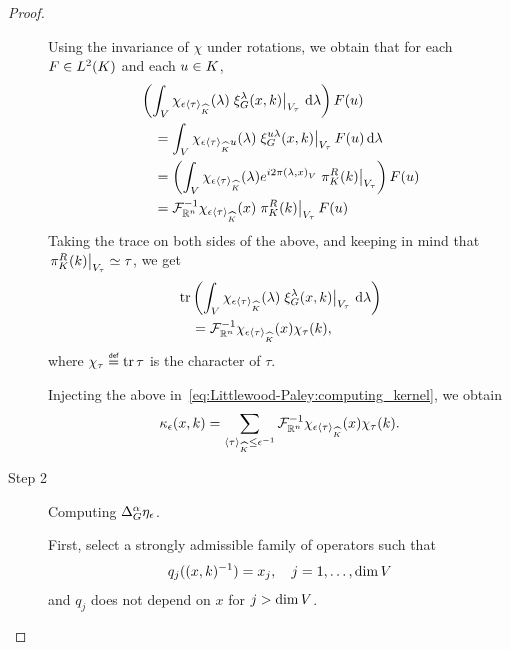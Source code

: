 \begin{proof}
\begin{description}
            Using the invariance of $\chi$ under rotations,
            we obtain that
            for each $F \in \Lebesgue 2 \CompactGroup$ and each $u \in \CompactGroup$,
            \begin{align*}
                &\left(\int_\VectorSpace \chi_{\epsilon \JapaneseBracket \CompactGroup \tau} (\lambda) \eval {\Rep \lambda(x, k)} {V_\tau} \dd \lambda\right) F(u)\\
                &\quad = \int_\VectorSpace \chi_{\epsilon \JapaneseBracket \CompactGroup \tau u} (\lambda) \eval {\Rep {u \lambda}(x, k)} {V_\tau} F(u) \dd \lambda\\
                &\quad = \left(\int_\VectorSpace \chi_{\epsilon \JapaneseBracket \CompactGroup \tau} (\lambda) \e^{\i \turn \ip \lambda x} \eval {\RightRegularRepresentation(k)} {V_\tau}\right) F(u)\\
                &\quad = \InverseFourier [\R^n] \chi_{\epsilon \JapaneseBracket \CompactGroup \tau}(x) \eval {\RightRegularRepresentation(k)} {V_\tau} F(u)
            \end{align*}
            Taking the trace on both sides of the above,
            and keeping in mind that $\eval {\RightRegularRepresentation(k)} {V_\tau} \simeq \tau$,
            we get
            \begin{align*}
                &\tr \left(\int_\VectorSpace \chi_{\epsilon \JapaneseBracket \CompactGroup \tau} (\lambda) \eval {\Rep \lambda(x, k)} {V_\tau} \dd \lambda\right)\\
                &\quad = \InverseFourier [\R^n] \chi_{\epsilon \JapaneseBracket \CompactGroup \tau}(x) \chi_\tau(k),
            \end{align*}
            where $\chi_\tau \defeq \tr \tau$ is the character of $\tau$.

            Injecting the above in~\eqref{eq:Littlewood-Paley:computing_kernel},
            we obtain
            \begin{align}
                \kappa_\epsilon(x, k)
                = \sum_{\JapaneseBracket \CompactGroup \tau \leq \epsilon^{-1}}
                \InverseFourier [\R^n] \chi_{\epsilon \JapaneseBracket \CompactGroup \tau}(x) \chi_\tau(k).
                \label{eq:Littlewood-Paley:kernel}
            \end{align}
        \item [Step 2] Computing $\DifferenceOperatorOrder \alpha \eta_\epsilon$.

            First, select a strongly admissible family of operators such that
            \begin{align*}
                q_j((x, k)^{-1}) = x_j, \quad j = 1, \dots, \dim \VectorSpace
            \end{align*}
            and $q_j$ does not depend on $x$ for $j > \dim \VectorSpace$.


\end{description}
\end{proof}
